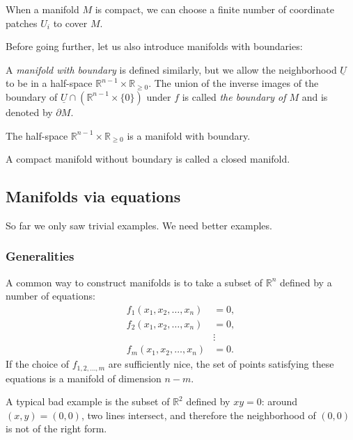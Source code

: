 \documentclass[12pt]{article}
\numberwithin{equation}{section}
\numberwithin{figure}{section}
\theoremstyle{remark}
\def\bR{\mathbb{R}}
\begin{document}
\begin{theorem}
When a manifold $M$ is compact,
we can choose a finite number of coordinate patches $U_i$ to cover $M$.
\end{theorem}

Before going further, let us also introduce manifolds with boundaries:
\begin{definition}
  A \emph{manifold with boundary} is defined similarly,
  but we allow the neighborhood $\underline{U}$ to be in a half-space $\bR^{n-1}\times \bR_{\ge 0}$.
  The union of the inverse images of the boundary of 
  $\underline{U}\cap (\bR^{n-1} \times \{0\})$ 
  under $f$ is called \emph{the boundary of $M$}
  and is denoted by $\partial M$.
\end{definition}  

\begin{example}
  The half-space $\bR^{n-1}\times \bR_{\ge 0}$ is a manifold with boundary.
\end{example}

\begin{definition}
  A compact manifold without boundary is called a closed manifold.
\end{definition}


\subsection{Manifolds via equations}
So far we only saw trivial examples.
We need better examples.

\subsubsection{Generalities}
A common way to construct manifolds is to take a subset of $\bR^n$ defined by a number of equations:
\begin{align}
f_1(x_1, x_2, \ldots, x_n) &= 0, \\
f_2(x_1, x_2, \ldots, x_n) &= 0, \\
&\vdots \\
f_m(x_1, x_2, \ldots, x_n) &= 0.
\end{align}
If the choice of $f_{1,2,\ldots,m}$ are sufficiently nice,
the set of points satisfying these equations is a manifold of dimension $n-m$.

A typical bad example is the subset of $\bR^2$ defined by $xy=0$: around $(x,y)=(0,0)$, two lines intersect, and therefore the neighborhood of $(0,0)$ is not of the right form.
\end{document}
